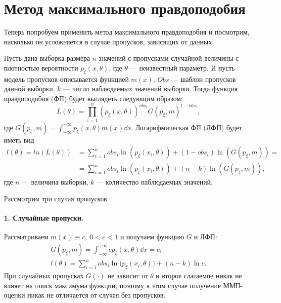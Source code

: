 \section{Метод максимального правдоподобия}

    Теперь попробуем применить метод максимального правдоподобия и посмотрим, насколько он усложняется в случае пропусков, 
    зависящих от данных.  
    
    Пусть дана выборка размера $n$ значений с пропусками случайной величины с плотностью вероятности $p_\xi(x,\theta)$, где  
    $\theta$ --- неизвестный параметр. И пусть модель пропусков описывается функцией $m(x)$, $Obs$ --- шаблон пропусков данной выборки, 
    $k$ --- число наблюдаемых значений выборки. Тогда функция правдоподобия (ФП) будет выглядеть следующим образом:
    \begin{equation*}
        L(\theta) = \prod_{i=1}^{n}(p_\xi(x,\theta))^{obs_i}G(p_\xi, m)^{1-obs_i},
    \end{equation*}
    где $G(p_\xi, m) = \int_{-\infty}^{+\infty}p_\xi(x, \theta)m(x)\dd x$.
    Логарифмическая ФП (ЛФП) будет иметь вид
    \begin{align*}
        l(\theta) = ln(L(\theta)) &= \sum_{i=1}^{n}obs_i \ln(p_\xi(x_i,\theta)) + (1 - obs_i)\ln(G(p_\xi,m)) = \\
                                  &= \sum_{i=1}^{n}obs_i\ln(p_\xi(x_i,\theta)) + (n-k)\ln(G(p_\xi,m)),
    \end{align*}
    где $n$ --- величина выборки, $k$ --- количество наблюдаемых значений.

    Рассмотрим три случая пропусков
    \paragraph{1. Случайные пропуски.} Рассматриваем $m(x) \equiv c,\ 0 < c < 1$ и получаем функцию $G$ и ЛФП:
    \begin{gather*}
        G(p_\xi, m) = \int_{-\infty}^{+\infty}cp_\xi(x,\theta)\dd x = c, \\
        l(\theta) = \sum_{i=1}^{n}obs_i\ln\big(p_\xi(x_i,\theta)\big) + (n-k)\ln c.
    \end{gather*}
    При случайных пропусках $G(\cdot)$ не зависит от $\theta$ и второе слагаемое никак не влияет на поиск
    максимума функции, поэтому в этом случае получение ММП-оценки никак не отличается от случая без
    пропусков.

